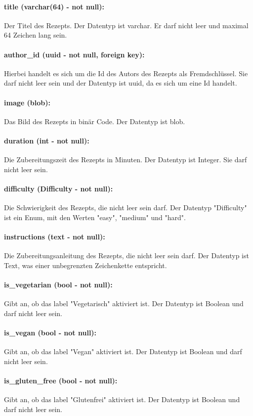\documentclass[parskip=full]{scrartcl}
\begin{document}
\paragraph{title (varchar(64) - not null):} Der Titel des Rezepts. Der Datentyp ist \Gls{varchar}. Er darf nicht leer und maximal 64 Zeichen lang sein.
\paragraph{author\_id (uuid - not null, foreign key):} Hierbei handelt es sich um die Id des Autors des Rezepts als Fremdschlüssel. Sie darf nicht leer sein und der Datentyp ist \Gls{uuid}, da es sich um eine Id handelt.
\paragraph{image (blob):} Das Bild des Rezepts in binär Code. Der Datentyp ist \Gls{blob}.
\paragraph{duration (int - not null):} Die Zubereitungszeit des Rezepts in Minuten. Der Datentyp ist Integer. Sie darf nicht leer sein.
\paragraph{difficulty (Difficulty - not null):} Die Schwierigkeit des Rezepts, die nicht leer sein darf. Der Datentyp "Difficulty" ist ein Enum, mit den Werten "easy", "medium" und "hard".
\paragraph{instructions (text - not null):} Die Zubereitungsanleitung des Rezepts, die nicht leer sein darf. Der Datentyp ist Text, was einer unbegrenzten Zeichenkette entspricht.
\paragraph{is\_vegetarian (bool - not null):} Gibt an, ob das \Gls{label} "Vegetarisch" aktiviert ist. Der Datentyp ist Boolean und darf nicht leer sein.
\paragraph{is\_vegan (bool - not null):} Gibt an, ob das \Gls{label} "Vegan" aktiviert ist. Der Datentyp ist Boolean und darf nicht leer sein.
\paragraph{is\_gluten\_free (bool - not null):} Gibt an, ob das \Gls{label} "Glutenfrei" aktiviert ist. Der Datentyp ist Boolean und darf nicht leer sein.
\end{document}
